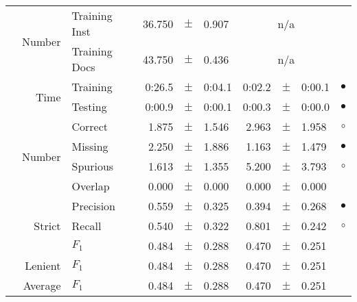 \begin{longtable}{|r|r|l||rcl|rcl|c|}
\cline{2-10} & \multirow{2}{*}{    Number} &   Training Inst &      36.750 &  $\pm$  &       0.907 &    \multicolumn{3}{c|}{n/a}         &  \\
\cline{3-10} &                             &   Training Docs &      43.750 &  $\pm$  &       0.436 &    \multicolumn{3}{c|}{n/a}         &  \\
\cline{2-10} & \multirow{2}{*}{      Time} &        Training &      0:26.5 &  $\pm$  &      0:04.1 &      0:02.2 &  $\pm$  &      0:00.1 & $\bullet$ \\
\cline{3-10} &                             &         Testing &      0:00.9 &  $\pm$  &      0:00.1 &      0:00.3 &  $\pm$  &      0:00.0 & $\bullet$ \\
\hline
\pagebreak[4]
\hline
\hline
\multirow{11}{*}{\begin{sideways}injuries\end{sideways} }
             & \multirow{4}{*}{    Number} &         Correct &       1.875 &  $\pm$  &       1.546 &       2.963 &  $\pm$  &       1.958 & $\circ$ \\
\cline{3-10} &                             &         Missing &       2.250 &  $\pm$  &       1.886 &       1.163 &  $\pm$  &       1.479 & $\bullet$ \\
\cline{3-10} &                             &        Spurious &       1.613 &  $\pm$  &       1.355 &       5.200 &  $\pm$  &       3.793 & $\circ$ \\
\cline{3-10} &                             &         Overlap &       0.000 &  $\pm$  &       0.000 &       0.000 &  $\pm$  &       0.000 &  \\
\cline{2-10} & \multirow{3}{*}{    Strict} &       Precision &       0.559 &  $\pm$  &       0.325 &       0.394 &  $\pm$  &       0.268 & $\bullet$ \\
\cline{3-10} &                             &          Recall &       0.540 &  $\pm$  &       0.322 &       0.801 &  $\pm$  &       0.242 & $\circ$ \\
\cline{3-10} &                             &           $F_1$ &       0.484 &  $\pm$  &       0.288 &       0.470 &  $\pm$  &       0.251 &  \\
\cline{2-10} &                     Lenient &           $F_1$ &       0.484 &  $\pm$  &       0.288 &       0.470 &  $\pm$  &       0.251 &  \\
\cline{2-10} &                     Average &           $F_1$ &       0.484 &  $\pm$  &       0.288 &       0.470 &  $\pm$  &       0.251 &  \\

\end{longtable}
